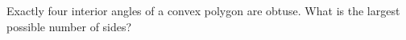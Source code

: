 Exactly four interior angles of a convex polygon are obtuse. What is the largest possible number of sides?
